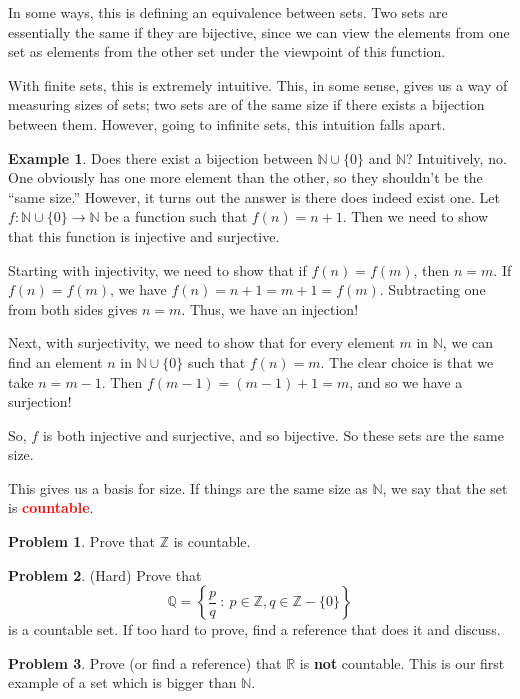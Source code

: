 \documentclass{book}
\theoremstyle{definition}
\newtheorem{problem}{Problem}
\numberwithin{problem}{chapter}
\numberwithin{solution}{chapter}
\numberwithin{theorem}{chapter}
\numberwithin{definition}{chapter}
\newtheorem{example}{Example}
\numberwithin{example}{chapter}
\numberwithin{remark}{chapter}
\numberwithin{claim}{chapter}
\numberwithin{fact}{chapter}
\numberwithin{preliminary}{chapter}
\numberwithin{corollary}{theorem}
\numberwithin{lemma}{chapter}
\numberwithin{proposition}{chapter}
\newcommand{\deff}[1]{\textbf{\textcolor{red}{#1}}}
\begin{document}
In some ways, this is defining an equivalence between sets. Two sets are essentially the same if they are bijective, since we can view the elements from one set as elements from the other set under the viewpoint of this function. 

With finite sets, this is extremely intuitive. This, in some sense, gives us a way of measuring sizes of sets; two sets are of the same size if there exists a bijection between them. However, going to infinite sets, this intuition falls apart.

\begin{example}
 Does there exist a bijection between $\mathbb{N} \cup \{0\}$ and $\mathbb{N}$? Intuitively, no. One obviously has one more element than the other, so they shouldn't be the ``same size.'' However, it turns out the answer is there does indeed exist one. Let $f : \mathbb{N} \cup \{0\} \rightarrow \mathbb{N}$ be a function such that $f(n) = n+1$. Then we need to show that this function is injective and surjective. 
    
    Starting with injectivity, we need to show that if $f(n) = f(m)$, then $n = m$. If $f(n) = f(m)$, we have $f(n) = n + 1 = m + 1 = f(m)$. Subtracting one from both sides gives $n = m$. Thus, we have an injection!
    
    Next, with surjectivity, we need to show that for every element $m$ in $\mathbb{N}$, we can find an element $n$ in $\mathbb{N} \cup \{0\}$ such that $f(n) = m$. The clear choice is that we take $n = m-1$. Then $f(m-1) = (m-1) + 1 = m$, and so we have a surjection!
    
    So, $f$ is both injective and surjective, and so bijective. So these sets are the same size.
\end{example}

This gives us a basis for size. If things are the same size as $\mathbb{N}$, we say that the set is \deff{countable}.

\begin{problem}
Prove that $\mathbb{Z}$ is countable.
\end{problem}

\begin{problem}
(Hard) Prove that 
\[\mathbb{Q} = \left\{ \frac{p}{q} \ : \ p \in \mathbb{Z}, q \in \mathbb{Z} - \{0\} \right\} \]
is a countable set. If too hard to prove, find a reference that does it and discuss.
\end{problem}

\begin{problem}
Prove (or find a reference) that $\mathbb{R}$ is \textbf{not} countable. This is our first example of a set which is bigger than $\mathbb{N}$.
\end{problem}
\end{document}
